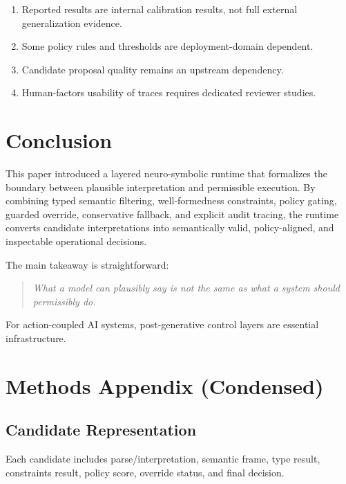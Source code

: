 \documentclass[11pt,a4paper]{article}
\begin{document}
\begin{enumerate}[leftmargin=*, itemsep=2pt]
  \item Reported results are internal calibration results, not full external generalization evidence.
  \item Some policy rules and thresholds are deployment-domain dependent.
  \item Candidate proposal quality remains an upstream dependency.
  \item Human-factors usability of traces requires dedicated reviewer studies.
\end{enumerate}

\section{Conclusion}

This paper introduced a layered neuro-symbolic runtime that formalizes the boundary between plausible interpretation and permissible execution. By combining typed semantic filtering, well-formedness constraints, policy gating, guarded override, conservative fallback, and explicit audit tracing, the runtime converts candidate interpretations into semantically valid, policy-aligned, and inspectable operational decisions.

The main takeaway is straightforward:

\begin{quote}
\emph{What a model can plausibly say is not the same as what a system should permissibly do.}
\end{quote}

For action-coupled AI systems, post-generative control layers are essential infrastructure.

\appendix
\section{Methods Appendix (Condensed)}

\subsection{Candidate Representation}
Each candidate includes parse/interpretation, semantic frame, type result, constraints result, policy score, override status, and final decision.
\end{document}
